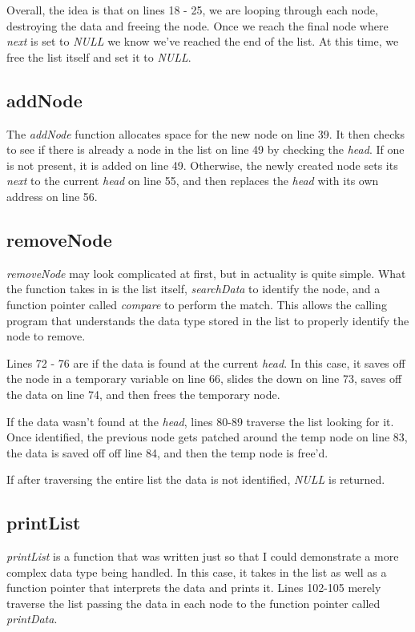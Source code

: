 \documentclass[../main.tex]{subfiles}
\begin{document}
	Overall, the idea is that on lines 18 - 25, we are looping through each node, destroying the data and freeing the node.  Once we reach the final node where \textit{next} is set to \textit{NULL} we know we've reached the end of the list.  At this time, we free the list itself and set it to \textit{NULL}.

	\subsection{addNode}
	The \textit{addNode} function allocates space for the new node on line 39.  It then checks to see if there is already a node in the list on line 49 by checking the \textit{head}.  If one is not present, it is added on line 49.  Otherwise, the newly created node sets its \textit{next} to the current \textit{head} on line 55, and then replaces the \textit{head} with its own address on line 56.
	
	\subsection{removeNode}
	\textit{removeNode} may look complicated at first, but in actuality is quite simple.  What the function takes in is the list itself, \textit{searchData} to identify the node, and a function pointer called \textit{compare} to perform the match.  This allows the calling program that understands the data type stored in the list to properly identify the node to remove.
	
	Lines 72 - 76 are if the data is found at the current \textit{head}.  In this case, it saves off the node in a temporary variable on line 66, slides the  down on line 73, saves off the data on line 74, and then frees the temporary node.  
	
	If the data wasn't found at the \textit{head}, lines 80-89 traverse the list looking for it.  Once identified, the previous node gets patched around the temp node on line 83, the data is saved off off line 84, and then the temp node is free'd.
	
	If after traversing the entire list the data is not identified, \textit{NULL} is returned.
	
	\subsection{printList}
	\textit{printList} is a function that was written just so that I could demonstrate a more complex data type being handled.  In this case, it takes in the list as well as a function pointer that interprets the data and prints it.  Lines 102-105 merely traverse the list passing the data in each node to the function pointer called \textit{printData}.
	
\end{document}
